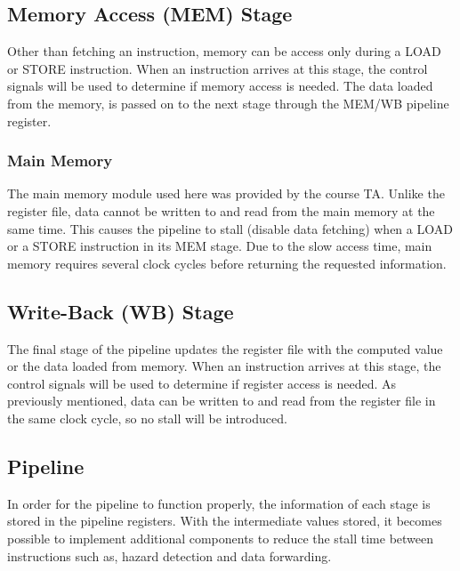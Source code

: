 \documentclass[conference]{IEEEtran}
\begin{document}
\subsection{Memory Access (MEM) Stage}

Other than fetching an instruction, memory can be access only during a LOAD or STORE instruction. When an instruction arrives at this stage, the control signals will be used to determine if memory access is needed. The data loaded from the memory, is passed on to the next stage through the MEM/WB pipeline register. 

\subsubsection{Main Memory}
The main memory module used here was provided by the course TA. Unlike the register file, data cannot be written to and read from the main memory at the same time. This causes the pipeline to stall (disable data fetching) when a LOAD or a STORE instruction in its MEM stage. Due to the slow access time, main memory requires several clock cycles before returning the requested information.

\subsection{Write-Back (WB) Stage}

The final stage of the pipeline updates the register file with the computed value or the data loaded from memory. When an instruction arrives at this stage, the control signals will be used to determine if register access is needed. As previously mentioned, data can be written to and read from the register file in the same clock cycle, so no stall will be introduced­.

\subsection{Pipeline}

In order for the pipeline to function properly, the information of each stage is stored in the pipeline registers. With the intermediate values stored, it becomes possible to implement additional components to reduce the stall time between instructions such as, hazard detection and data forwarding.
\end{document}
